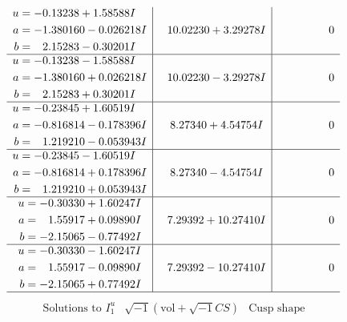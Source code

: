 \documentclass[1p]{elsarticle_modified}
\theoremstyle{definition}
\newcommand{\I}{\sqrt{-1}}
\begin{document}
$$\begin{array}{c|c|c}
\begin{aligned}
u &= -0.13238 + 1.58588 I \\
a &= -1.380160 - 0.026218 I \\
b &= \phantom{-}2.15283 - 0.30201 I\end{aligned}
 & \phantom{-}10.02230 + 3.29278 I & \phantom{-0.000000 } 0 \\ \hline\begin{aligned}
u &= -0.13238 - 1.58588 I \\
a &= -1.380160 + 0.026218 I \\
b &= \phantom{-}2.15283 + 0.30201 I\end{aligned}
 & \phantom{-}10.02230 - 3.29278 I & \phantom{-0.000000 } 0 \\ \hline\begin{aligned}
u &= -0.23845 + 1.60519 I \\
a &= -0.816814 - 0.178396 I \\
b &= \phantom{-}1.219210 - 0.053943 I\end{aligned}
 & \phantom{-}8.27340 + 4.54754 I & \phantom{-0.000000 } 0 \\ \hline\begin{aligned}
u &= -0.23845 - 1.60519 I \\
a &= -0.816814 + 0.178396 I \\
b &= \phantom{-}1.219210 + 0.053943 I\end{aligned}
 & \phantom{-}8.27340 - 4.54754 I & \phantom{-0.000000 } 0 \\ \hline\begin{aligned}
u &= -0.30330 + 1.60247 I \\
a &= \phantom{-}1.55917 + 0.09890 I \\
b &= -2.15065 - 0.77492 I\end{aligned}
 & \phantom{-}7.29392 + 10.27410 I & \phantom{-0.000000 } 0 \\ \hline\begin{aligned}
u &= -0.30330 - 1.60247 I \\
a &= \phantom{-}1.55917 - 0.09890 I \\
b &= -2.15065 + 0.77492 I\end{aligned}
 & \phantom{-}7.29392 - 10.27410 I & \phantom{-0.000000 } 0\\
 \hline 
 \end{array}$$\newpage$$\begin{array}{c|c|c}  
\text{Solutions to }I^u_{1}& \I (\text{vol} + \sqrt{-1}CS) & \text{Cusp shape}\\
 \hline 
\begin{aligned}

\end{aligned}
\end{array}$$
\end{document}
